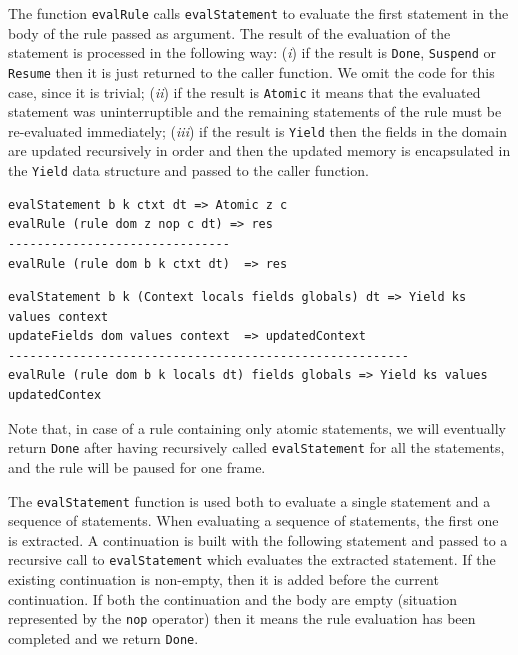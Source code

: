 The function \texttt{evalRule} calls \texttt{evalStatement} to evaluate the first statement in the body of the rule passed as argument. The result of the evaluation of the statement is processed in the following way: (\textit{i}) if the result is \texttt{Done}, \texttt{Suspend} or \texttt{Resume} then it is just returned to the caller function. We omit the code for this case, since it is trivial; (\textit{ii}) if the result is \texttt{Atomic} it means that the evaluated statement was uninterruptible and the remaining statements of the rule must be re-evaluated immediately; (\textit{iii}) if the result is \texttt{Yield} then the fields in the domain are updated recursively in order and then the updated memory is encapsulated in the \texttt{Yield} data structure and passed to the caller function.

\vspace{0.1cm}
\begin{lstlisting}
evalStatement b k ctxt dt => Atomic z c    
evalRule (rule dom z nop c dt) => res
-------------------------------
evalRule (rule dom b k ctxt dt)  => res
\end{lstlisting}

\begin{lstlisting}
evalStatement b k (Context locals fields globals) dt => Yield ks values context
updateFields dom values context  => updatedContext
--------------------------------------------------------
evalRule (rule dom b k locals dt) fields globals => Yield ks values updatedContex
\end{lstlisting}

Note that, in case of a rule containing only atomic statements, we will eventually return \texttt{Done} after having recursively called \texttt{evalStatement} for all the statements, and the rule will be paused for one frame.

\noindent
The \texttt{evalStatement} function is used both to evaluate a single statement and a sequence of statements. When evaluating a sequence of statements, the first one is extracted. A continuation is built with the following statement and passed to a recursive call to \texttt{evalStatement} which evaluates the extracted statement. If the existing continuation is non-empty, then it is added before the current continuation. If both the continuation and the body are empty (situation represented by the \texttt{nop} operator) then it means the rule evaluation has been completed and we return \texttt{Done}.

